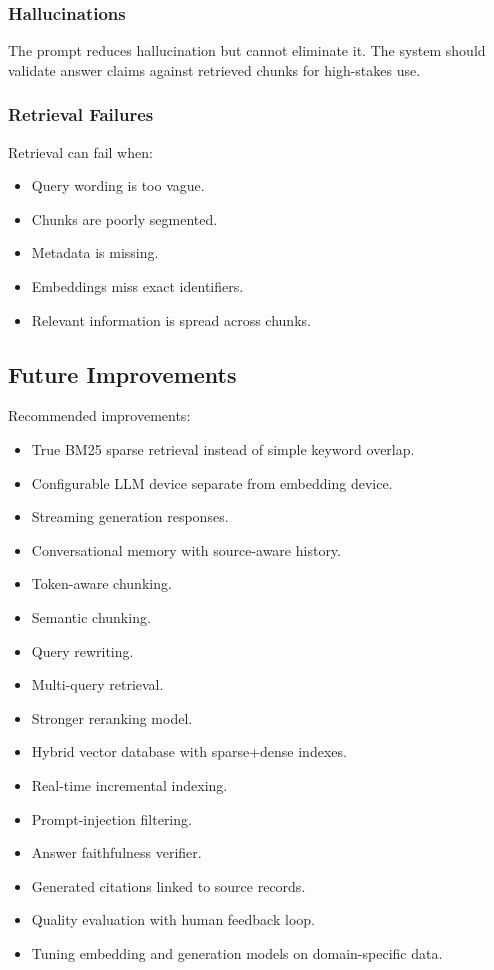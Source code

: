 ﻿\documentclass{article}
\begin{document}
\subsubsection{Hallucinations}
The prompt reduces hallucination but cannot eliminate it. The system should validate answer claims against retrieved chunks for high-stakes use.

\subsubsection{Retrieval Failures}
Retrieval can fail when:
\begin{itemize}
	\item Query wording is too vague.
	\item Chunks are poorly segmented.
	\item Metadata is missing.
	\item Embeddings miss exact identifiers.
	\item Relevant information is spread across chunks.
\end{itemize}


\subsection{Future Improvements}
Recommended improvements:
\begin{itemize}
	\item True BM25 sparse retrieval instead of simple keyword overlap.
	\item Configurable LLM device separate from embedding device.
	\item Streaming generation responses.
	\item Conversational memory with source-aware history.
	\item Token-aware chunking.
	\item Semantic chunking.
	\item Query rewriting.
	\item Multi-query retrieval.
	\item Stronger reranking model.
	\item Hybrid vector database with sparse+dense indexes.
	\item Real-time incremental indexing.
	\item Prompt-injection filtering.
	\item Answer faithfulness verifier.
	\item Generated citations linked to source records.
	\item Quality evaluation with human feedback loop.
	\item Tuning embedding and generation models on domain-specific data.
\end{itemize}
\end{document}

